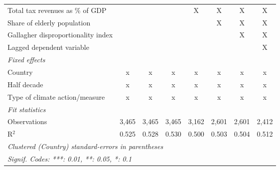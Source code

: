 \begin{table}[htbp]
\begin{tabular}{lccccccc}
      Total tax revenues as \% of GDP                                &                &                &                & X             & X             & X             & X\\  
      Share of elderly population                                    &                &                &                &               & X             & X             & X\\  
      Gallagher disproportionality index                             &                &                &                &               &               & X             & X\\  
      Lagged dependent variable                                      &                &                &                &               &               &               & X\\  
      \emph{Fixed effects}\\
      Country                                                        & x              & x              & x              & x             & x             & x             & x\\  
      Half decade                                                    & x              & x              & x              & x             & x             & x             & x\\  
      Type of climate action/measure                                 & x              & x              & x              & x             & x             & x             & x\\  
      \midrule \emph{Fit statistics}\\
      Observations                                                   & 3,465          & 3,465          & 3,465          & 3,162         & 2,601         & 2,601         & 2,412\\  
      R$^2$                                                          & 0.525          & 0.528          & 0.530          & 0.500         & 0.503         & 0.504         & 0.512\\  
      \midrule
      \multicolumn{8}{l}{\emph{Clustered (Country) standard-errors in parentheses}}\\
      \multicolumn{8}{l}{\emph{Signif. Codes: ***: 0.01, **: 0.05, *: 0.1}}\\
   \end{tabular}
\end{table}


